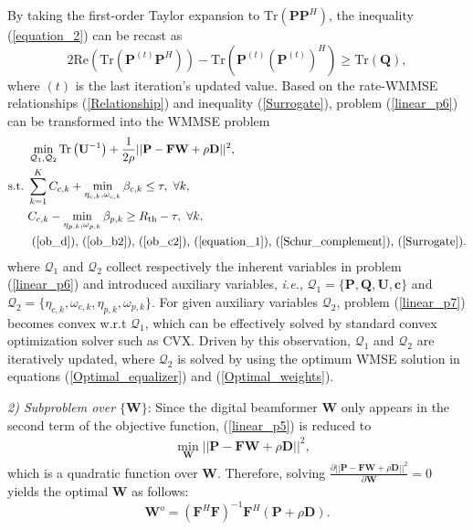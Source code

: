 \documentclass[10pt,journal,twocolumn]{IEEEtran}
\begin{document}
By taking the first-order Taylor expansion to  $\text{Tr}\left(\mathbf{P}\mathbf{P}^H\right)$, the  inequality (\ref{equation_2}) can be recast as
\begin{equation}
2\text{Re}\left(\text{Tr}\left(\mathbf{P}^{(t)}\mathbf{P}^H\right)\right)-\text{Tr}\left(\mathbf{P}^{(t)}\left(\mathbf{P}^{(t)}\right)^H\right)\geq \text{Tr}\left(\mathbf{Q}\right),
\label{Surrogate}
\end{equation}
where $(t)$ is the last iteration's updated value. Based on the rate-WMMSE relationships (\ref{Relationship}) and inequality (\ref{Surrogate}), problem (\ref{linear_p6}) can be transformed into the WMMSE problem 
\begin{subequations}\label{linear_p7}
	\begin{align}
&\min_{\mathcal{Q}_1,\mathcal{Q}_2} \text{Tr}\left(\mathbf{U}^{-1}\right)+\frac{1}{2\rho}||\mathbf{P}-\mathbf{FW} +\rho\mathbf{D}||^2,\label{ob_a7}\\
	\text{s.t.}~
 &\sum_{k=1}^{K}C_{c,k} + \min_{\eta_{c,k},\omega_{c,k}}\beta_{c,k} \leq \tau,~\forall k,\label{ob_b7}\\
 &C_{c,k} - \min_{\eta_{p,k},\omega_{p,k}}\beta_{p,k} \geq R_{\text{th}}-\tau,~\forall k,\label{ob_c7}\\
 &\mbox{ (\ref{ob_d}),~(\ref{ob_b2}),~(\ref{ob_c2}),~(\ref{equation_1}),~(\ref{Schur_complement}),~(\ref{Surrogate})}.\label{ob_d7}
	\end{align}
\end{subequations}
where $\mathcal {Q}_1$ and $\mathcal {Q}_2$ collect respectively the inherent variables in problem (\ref{linear_p6}) and introduced auxiliary variables, \emph{i.e.}, $\mathcal {Q}_1=\big\{\mathbf{P},\mathbf{Q},\mathbf{U},\mathbf{c}\big\}$ and $\mathcal {Q}_2=\big\{\eta_{c,k}, \omega_{c,k}, \eta_{p,k}, \omega_{p,k}\big\}$. For given auxiliary variables $\mathcal{Q}_2$, problem (\ref{linear_p7}) becomes convex w.r.t $\mathcal{Q}_1$, which can be effectively solved by standard convex optimization solver such as CVX\cite{cvx}. Driven by this observation, $\mathcal {Q}_1$ and $\mathcal {Q}_2$ are iteratively updated, where $\mathcal {Q}_2$ is solved by using the optimum WMSE solution in equations (\ref{Optimal_equalizer}) and (\ref{Optimal_weights}).

\emph{2) Subproblem over $\big\{\mathbf{W}\big\}$}: 
Since the digital beamformer $\mathbf{W}$ only appears in the second term of the objective function,  (\ref{linear_p5}) is reduced to
\begin{align}\label{linear_p8}
&\min_{\mathbf{W} } ||\mathbf{P}-\mathbf{FW} +\rho\mathbf{D}||^2,
\end{align} 
 which is a quadratic function over $\mathbf{W}$. Therefore, solving $\frac{\partial ||\mathbf{P}-\mathbf{FW}+\rho\mathbf{D}||^2}{\partial \mathbf{W}}=0$ yields the  optimal $\mathbf{W}$ as follows:  
\begin{equation}
\mathbf{W}^o=\left(\mathbf{F}^H\mathbf{F}\right)^{-1}\mathbf{F}^H\left(\mathbf{P}+\rho\mathbf{D}\right).
\label{Optimal_digital}
\end{equation} 
\end{document}

